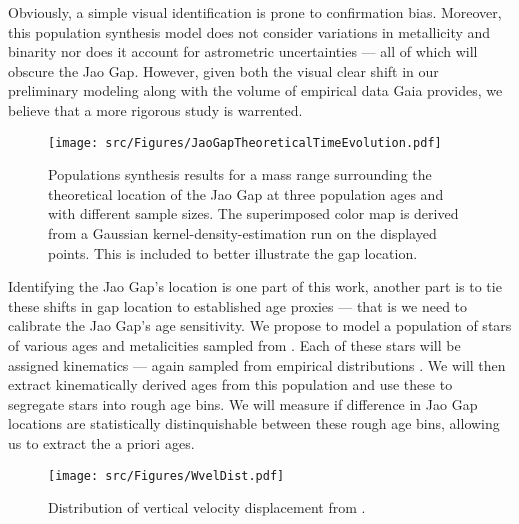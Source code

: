 Obviously, a simple visual identification is prone to confirmation bias.
Moreover, this population synthesis model does not consider variations in
metallicity and binarity nor does it account for astrometric uncertainties ---
all of which will obscure the Jao Gap. However, given both the visual clear
shift in our preliminary modeling along with the volume of empirical data Gaia
provides, we believe that a more rigorous study is warrented.


\begin{figure}
	\centering
	\texttt{[image: src/Figures/JaoGapTheoreticalTimeEvolution.pdf]}
	\caption{Populations synthesis results for a mass range surrounding the
	theoretical location of the Jao Gap at three population ages and with different
	sample sizes. The superimposed color map is derived from a Gaussian
	kernel-density-estimation run on the displayed points. This is included to
	better illustrate the gap location.}
	\label{fig:JGTTE}
\end{figure}

Identifying the Jao Gap's location is one part of this work, another part is to
tie these shifts in gap location to established age proxies --- that is we need
to calibrate the Jao Gap's age sensitivity. We propose to model a population of
stars of various ages and metalicities sampled from \citet{Holmberg2009}.
Each of these stars will be assigned kinematics --- again sampled from
empirical distributions \citep[Figure \ref{fig:LuKde},][]{Lu2021}. We will then
extract kinematically derived ages from this population and use these to
segregate stars into rough age bins. We will measure if difference in
Jao Gap locations are statistically distinquishable between these rough age
bins, allowing us to extract the a priori ages.

\begin{figure}
	\centering
	\texttt{[image: src/Figures/WvelDist.pdf]}
	\caption{Distribution of vertical velocity displacement from \citet{Lu2021}.}
	\label{fig:LuKde}
\end{figure}
